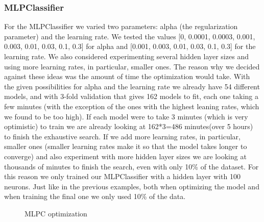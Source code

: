 \documentclass[12pt]{article}
\begin{document}
        
\subsubsection{MLPClassifier}
\label{subsubsection.mlpc_tunning}
    \par 
        For the MLPClassifier we varied two parameters: alpha (the regularization parameter) and the learning rate. We tested the values 
        [0, 0.0001, 0.0003, 0.001, 0.003, 0.01, 0.03, 0.1, 0.3] for alpha and [0.001, 0.003, 0.01, 0.03, 0.1, 0.3] for the learning rate.
        We also considered experimenting several hidden layer sizes\cite{nn_faq} and using more learning rates, in particular, smaller ones.
        The reason why we decided against these ideas was the amount of time the optimization would take. With the given possibilities for 
        alpha and the learning rate we already have 54 different models, and with 3-fold validation that gives 162 models to fit, each one 
        taking a few minutes (with the exception of the ones with the highest leaning rates, which we found to be too high). If each model 
        were to take 3 minutes (which is very optimistic) to train we are already looking at 162*3=486 minutes(over 5 hours) to finish the exhaustive 
        search. If we add 
        more learning rates, in particular, smaller ones (smaller learning rates make it so that the model takes longer to converge) and also 
        experiment with more hidden layer sizes we are looking at thousands of minutes to finish the search, even with only 10\% of the dataset. 
        For this reason we only trained our 
        MLPClassifier with a hidden layer with 100 neurons. Just like in the previous examples, both when optimizing the model and when 
        training the final one we only used 10\% of the data.

    \begin{figure}[!htb]
        \caption{MLPC optimization}
        \label{img_nn_opti}
    \end{figure}
\end{document}
